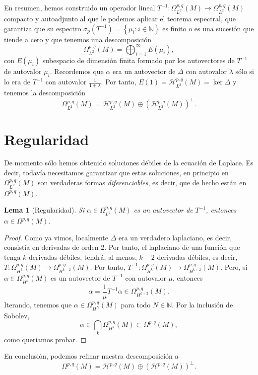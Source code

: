 \documentclass[12pt,a4paper]{article}
\newtheorem{lema}[thm]{Lema}
\theoremstyle{definition} \newtheorem{defn}[thm]{Definición}
\theoremstyle{definition} \newtheorem{ejemplo}[thm]{Ejemplo}
\theoremstyle{definition} \newtheorem{ejercicio}[thm]{Ejercicio}
\theoremstyle{remark} \newtheorem*{obs}{Observación}
\newcommand{\NN}{\mathbb{N}}
\begin{document}
    En resumen, hemos construido un operador lineal $T^{-1}:\Omega^{p,q}_{L^2}(M)\rightarrow \Omega^{p,q}_{L^2}(M)$ compacto y autoadjunto al que le podemos aplicar el teorema espectral, que garantiza que su espectro $\sigma_p(T^{-1})=\left\{ \mu_i:i\in \NN \right\}$ es finito o es una sucesión que tiende a cero y que tenemos una descomposición
    \begin{equation*}
      \Omega^{p,q}_{L^2}(M)=\bigoplus_{i=1}^{\infty} E(\mu_i),
    \end{equation*}
    con $E(\mu_i)$ subespacio de dimensión finita formado por los autovectores de $T^{-1}$ de autovalor $\mu_i$. Recordemos que $\alpha$ era un autovector de $\Delta$ con autovalor $\lambda$ sólo si lo era de $T^{-1}$ con autovalor $\frac{1}{1+\lambda}$. Por tanto, $E(1)=\mathcal{H}^{p,q}_{L^2}(M)=\ker \Delta$ y tenemos la descomposición
    \begin{equation*}
      \Omega^{p,q}_{L^2}(M)=\mathcal{H}^{p,q}_{L^2}(M)\oplus(\mathcal{H}^{p,q}_{L^2}(M))^{\perp}.
    \end{equation*}

    \section{Regularidad}
    De momento sólo hemos obtenido soluciones débiles de la ecuación de Laplace. Es decir, todavía necesitamos garantizar que estas soluciones, en principio en $\Omega^{p,q}_{L^2}(M)$ son verdaderas formas \emph{diferenciables}, es decir, que de hecho están en $\Omega^{p,q}(M)$.

    \begin{lema}[Regularidad]
      Si $\alpha \in \Omega^{p,q}_{L^2}(M)$ es un autovector de $T^{-1}$, entonces $\alpha \in \Omega^{p,q}(M)$.
    \end{lema}
    \begin{proof}
      Como ya vimos, localmente $\Delta$ era un verdadero laplaciano, es decir, consistía en derivadas de orden 2. Por tanto, el laplaciano de una función que tenga $k$ derivadas débiles, tendrá, al menos, $k-2$ derivadas débiles, es decir, $T:\Omega^{p,q}_{H^k}(M) \rightarrow \Omega^{p,q}_{H^{k-2}}(M)$. Por tanto, $T^{-1}:\Omega^{p,q}_{H^{k}}(M) \rightarrow \Omega^{p,q}_{H^{k+2}}(M)$.     Pero, si $\alpha\in \Omega^{p,q}_{H^k}(M)$ es un autovector de $T^{-1}$ con autovalor $\mu$, entonces $$\alpha =\frac{1}{\mu} T^{-1}\alpha \in \Omega^{p,q}_{H^{k+2}}(M).$$ Iterando, tenemos que $\alpha \in \Omega^{p,q}_{H^{N}}(M)$ para todo $N\in \NN$. Por la inclusión de Sobolev,
      \begin{equation*}
	\alpha \in \bigcap_k \Omega^{p,q}_{H^k}(M) \subset \Omega^{p,q}(M),
      \end{equation*}
      como queríamos probar.
    \end{proof}
    En conclusión, podemos refinar nuestra descomposición a
    \begin{equation*}
      \Omega^{p,q}(M)=\mathcal{H}^{p,q}(M) \oplus (\mathcal{H}^{p,q}(M))^{\perp}.
    \end{equation*}
\end{document}
